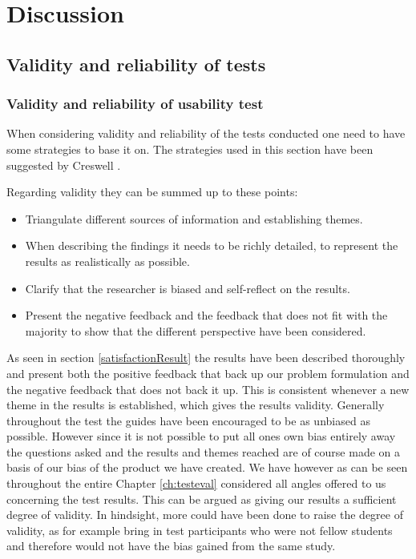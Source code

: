 \chapter{Discussion}\label{ch:discussion}

\section{Validity and reliability of tests}

\subsection{Validity and reliability of usability test}
When considering validity and reliability of the tests conducted one need to have some strategies to base it on. The strategies used in this section have been suggested by Creswell \citep{Creswell}.

Regarding validity they can be summed up to these points:
\begin{itemize}
\item Triangulate different sources of information and establishing themes.
\item When describing the findings it needs to be richly detailed, to represent the results as realistically as possible.
\item Clarify that the researcher is biased and self-reflect on the results.
\item Present the negative feedback and the feedback that does not fit with the majority to show that the different perspective have been considered.
\end{itemize}

As seen in section \ref{satisfactionResult} the results have been described thoroughly and present both the positive feedback that back up our problem formulation and the negative feedback that does not back it up. This is consistent whenever a new theme in the results is established, which gives the results validity. Generally throughout the test the guides have been encouraged to be as unbiased as possible. However since it is not possible to put all ones own bias entirely away the questions asked and the results and themes reached are of course made on a basis of our bias of the product we have created. We have however as can be seen throughout the entire Chapter \ref{ch:testeval} considered all angles offered to us concerning the test results. This can be argued as giving our results a sufficient degree of validity. In hindsight, more could have been done to raise the degree of validity, as for example bring in test participants who were not fellow students and therefore would not have the bias gained from the same study. 


